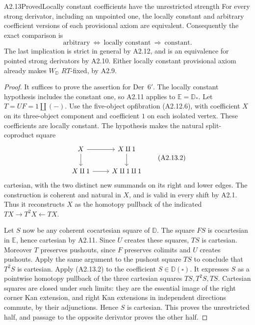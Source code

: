 \begin{claim}{A2.13}{Proved}{Locally constant coefficients have the unrestricted strength}
\label{A2-locally-constant-full}
For every strong derivator, including an unpointed one, the locally
constant and arbitrary coefficient versions of each provisional axiom
are equivalent. Consequently the exact comparison is
\[
 \text{arbitrary}\ \Longleftrightarrow\ \text{locally constant}
 \ \Longrightarrow\ \text{constant}.
 \tag{A2.13.1}
\]
The last implication is strict in general by A2.12, and is an equivalence
for pointed strong derivators by A2.10. Either locally constant provisional
axiom already makes $W_{\mathbb D}$ $RT$-fixed, by A2.9.
\end{claim}
\begin{proof}
It suffices to prove the assertion for Der~$6'$. The locally constant
hypothesis includes the constant one, so A2.11 applies to
$\mathbb E=\mathbb D_*$. Let $T=UF=1\amalg(-)$.
Use the five-object opfibration (A2.12.6), with coefficient $X$ on its
three-object component and coefficient $1$ on each isolated vertex.
These coefficients are locally constant. The hypothesis makes the natural
split-coproduct square
\[
 \begin{tikzcd}
 X\ar[r]\ar[d]&X\amalg1\ar[d]\\
 X\amalg1\ar[r]&X\amalg1\amalg1
 \end{tikzcd}
 \tag{A2.13.2}
\]
cartesian, with the two distinct new summands on its right and lower edges.
The construction is coherent and natural in $X$, and is valid in every
shift by A2.1. Thus it reconstructs $X$ as the homotopy pullback of
the indicated $TX\to T^2X\leftarrow TX$.

Let $S$ now be any coherent cocartesian square of $\mathbb D$.
The square $FS$ is cocartesian in $\mathbb E$, hence cartesian by A2.11.
Since $U$ creates these squares, $TS$ is cartesian. Moreover $T$ preserves
pushouts, since $F$ preserves colimits and $U$ creates pushouts.
Apply the same argument to the pushout square $TS$ to conclude that
$T^2S$ is cartesian.
Apply (A2.13.2) to the coefficient $S\in\mathbb D(\square)$.
It expresses $S$ as a pointwise homotopy pullback of the three cartesian
squares $TS,T^2S,TS$. Cartesian squares are closed under such limits:
they are the essential image of the right corner Kan extension, and
right Kan extensions in independent directions commute, by their
adjunctions. Hence $S$ is cartesian. This proves the unrestricted half,
and passage to the opposite derivator proves the other half.
\end{proof}

